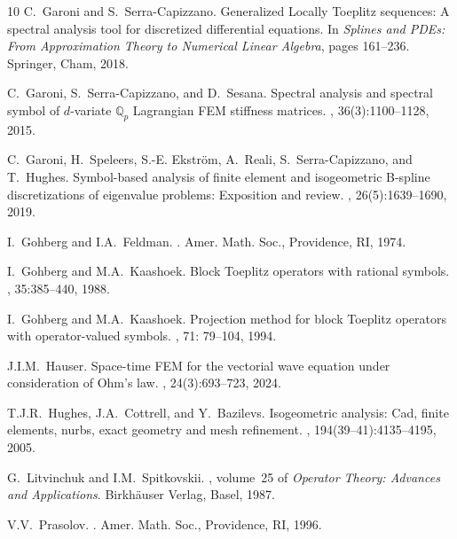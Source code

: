 \documentclass[addpoints,12pt,letter]{article}
\numberwithin{equation}{section}
\theoremstyle{definition}
\begin{document}
\begin{thebibliography}{10}
C.~Garoni and S.~Serra-Capizzano.
\newblock Generalized {L}ocally {T}oeplitz sequences: {A} spectral analysis tool for discretized differential equations.
\newblock In {\em Splines and PDEs: From Approximation Theory to Numerical Linear Algebra}, pages 161--236. Springer, Cham, 2018.

C.~Garoni, S.~Serra-Capizzano, and D.~Sesana.
\newblock Spectral analysis and spectral symbol of $d$-variate $\mathbb{Q}_p$ {L}agrangian {FEM} stiffness matrices.
, 36(3):1100--1128, 2015.

C.~Garoni, H.~Speleers, S.-E. Ekstr{\"{o}}m, A.~Reali, S.~Serra-Capizzano, and T.~Hughes.
\newblock Symbol-based analysis of finite element and isogeometric {B}-spline discretizations of eigenvalue problems: {E}xposition and review.
, 26(5):1639--1690, 2019.

I.~Gohberg and {\relax I.A}.~Feldman.
.
\newblock Amer. Math. Soc., Providence, RI, 1974.

I.~Gohberg and {\relax M.A}.~Kaashoek.
\newblock Block {T}oeplitz operators with rational symbols.
, 35:385--440, 1988.

I.~Gohberg and {\relax M.A}.~Kaashoek.
\newblock Projection method for block {T}oeplitz operators with operator-valued symbols.
, 71: 79--104, 1994.

{\relax J.I.M}.~Hauser.
\newblock Space-time {FEM} for the vectorial wave equation under consideration of {O}hm's law.
, 24(3):693--723, 2024.

{\relax T.J.R}.~Hughes, {\relax J.A}.~Cottrell, and Y.~Bazilevs.
\newblock Isogeometric analysis: Cad, finite elements, nurbs, exact geometry and mesh refinement.
, 194(39--41):4135--4195, 2005.

G.~Litvinchuk and {\relax I.M}.~Spitkovskii.
, volume~25 of {\em Operator Theory: Advances and Applications}.
\newblock Birkh\"auser Verlag, Basel, 1987.

{\relax V.V}.~Prasolov.
.
\newblock Amer. Math. Soc., Providence, RI, 1996.


\end{thebibliography}
\end{document}

